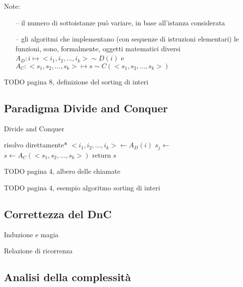 Note:
\begin{itemize}[noitemsep,parsep=0pt,partopsep=0pt]
    \item[--] il numero di sottoistanze può variare, in base all'istanza considerata
    \item[--] gli algoritmi che implementano (con sequenze di istruzioni elementari) le funzioni, sono, formalmente, oggetti matematici diversi \\
        $ A_D : i \mapsto <i_1, i_2, \dots, i_k> \sim D(i)$ e $ A_C : <s_1, s_2, \dots, s_k> \mapsto s \sim C(<s_1, s_2, \dots, s_k>) $
\end{itemize}

TODO pagina 8, definizione del sorting di interi

\subsection{Paradigma Divide and Conquer}

\begin{algorithm}[H]
\caption{Divide and Conquer}\label{alg:dnc}
\begin{algorithmic}[1]
                             
            \State *risolvo direttamente*
        \EndIf
        \State $<i_1, i_2, \dots, i_k> \gets A_D(i)$ 
                            
            \State $s_j \gets $ 
        \EndFor
        \State $s \gets A_C(<s_1, s_2, \dots, s_k>)$    
        \State return $s$
    \EndProcedure
\end{algorithmic}
\end{algorithm}

TODO pagina 4, albero delle chiamate

TODO pagina 4, esempio algoritmo sorting di interi 

\subsection{Correttezza del DnC}

Induzione e magia

Relazione di ricorrenza

\subsection{Analisi della complessità}

